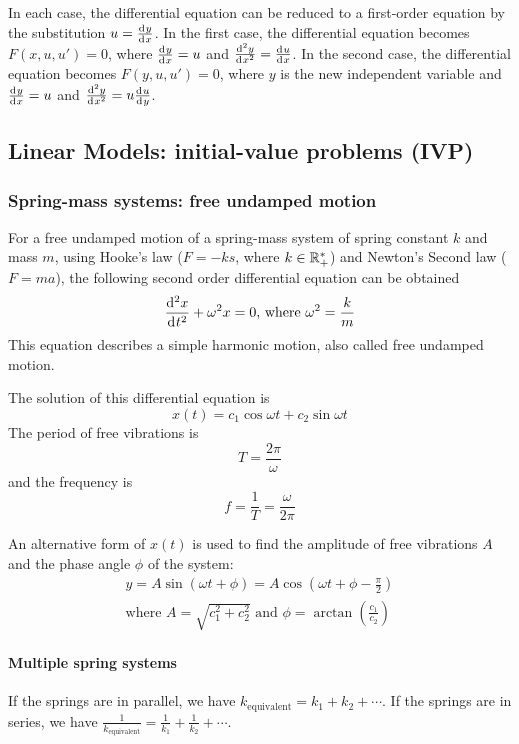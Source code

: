 \documentclass[10pt, twocolumn]{article}
\theoremstyle{definition}
\begin{document}
In each case, the differential equation can be reduced to a first-order equation by the substitution \(u = \frac{\mathrm{d}^{} y}{\mathrm{d}^{} x}\).
In the first case, the differential equation becomes \(F(x, u, u') = 0\), where \(\frac{\mathrm{d}^{} y}{\mathrm{d}^{} x} = u\) and \(\frac{\mathrm{d}^{2} y}{\mathrm{d}^{} x^{2}} = \frac{\mathrm{d}^{} u}{\mathrm{d}^{} x}\).
In the second case, the differential equation becomes \(F(y, u, u') = 0\), where \(y\) is the new independent variable and \(\frac{\mathrm{d}^{} y}{\mathrm{d}^{} x} = u\) and \(\frac{\mathrm{d}^{2} y}{\mathrm{d}^{} x^{2}} = u\frac{\mathrm{d}^{} u}{\mathrm{d}^{} y}\).


\subsection{Linear Models: initial-value problems (IVP)}
\subsubsection*{Spring-mass systems: free undamped motion}
For a free undamped motion of a spring-mass system of spring constant \(k\) and mass \(m\), using Hooke's law (\(F = -ks\), where \(k \in \mathbb{R}^*_+\)) and Newton's Second law (\(F = ma\)), the following second order differential equation can be obtained
\[
  \frac{\mathrm{d}^{2} x}{\mathrm{d}^{} t^{2}} + \omega^2 x = 0 \text{, where }\omega^2 = \frac{k}{m}
\]
This equation describes a simple harmonic motion, also called free undamped motion.

The solution of this differential equation is
\[
  x(t) = c_1 \cos{\omega t} + c_2 \sin{\omega t}
\]
The period of free vibrations is
\[
  T = \frac{2\pi}{\omega}
\]
and the frequency is
\[
  f = \frac{1}{T} = \frac{\omega}{2\pi}
\]

An alternative form of \(x(t)\) is used to find the amplitude of free vibrations \(A\) and the phase angle \(\phi\) of the system:
\begin{gather*}
  y = A\sin(\omega t + \phi) = A\cos(\omega t + \phi - \frac{\pi}{2}) \\
  \text{where } A = \sqrt{c_1 ^2 + c_2 ^2 } \text{ and } \phi = \arctan\left( \frac{c_1 }{c_2 } \right)
\end{gather*}

\paragraph*{Multiple spring systems}
If the springs are in parallel, we have \(k_{\mathrm{equivalent}} = k_1 + k_2 + \cdots\).
If the springs are in series, we have \(\frac{1}{k_{\mathrm{equivalent}}} = \frac{1}{k_1}+ \frac{1}{k_2} + \cdots\).
\end{document}

